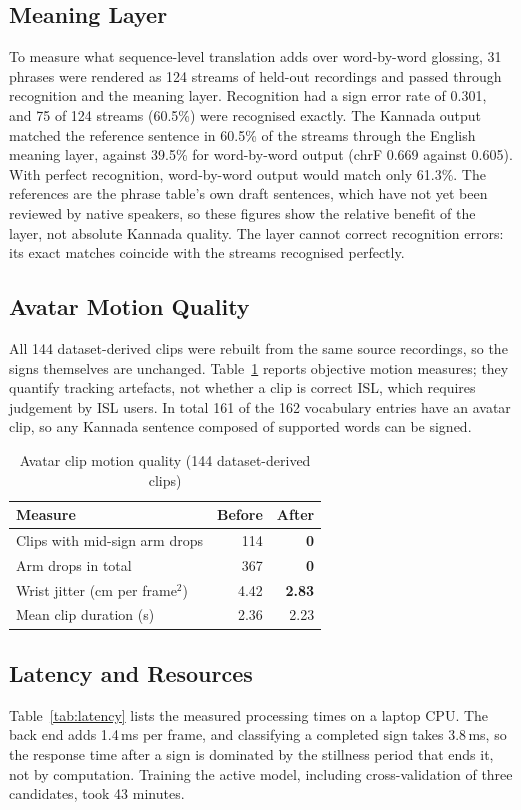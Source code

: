 \documentclass[conference]{IEEEtran}
\begin{document}
\subsection{Meaning Layer}
To measure what sequence-level translation adds over word-by-word glossing, 31 phrases were rendered as 124 streams of held-out recordings and passed through recognition and the meaning layer. Recognition had a sign error rate of 0.301, and 75 of 124 streams (60.5\%) were recognised exactly. The Kannada output matched the reference sentence in 60.5\% of the streams through the English meaning layer, against 39.5\% for word-by-word output (chrF 0.669 against 0.605). With perfect recognition, word-by-word output would match only 61.3\%. The references are the phrase table's own draft sentences, which have not yet been reviewed by native speakers, so these figures show the relative benefit of the layer, not absolute Kannada quality. The layer cannot correct recognition errors: its exact matches coincide with the streams recognised perfectly.

\subsection{Avatar Motion Quality}
All 144 dataset-derived clips were rebuilt from the same source recordings, so the signs themselves are unchanged. Table~\ref{tab:avatar} reports objective motion measures; they quantify tracking artefacts, not whether a clip is correct ISL, which requires judgement by ISL users. In total 161 of the 162 vocabulary entries have an avatar clip, so any Kannada sentence composed of supported words can be signed.

\begin{table}[t]
\caption{Avatar clip motion quality (144 dataset-derived clips)}
\label{tab:avatar}
\centering
\begin{tabular}{@{}lrr@{}}
\toprule
Measure & Before & After \\
\midrule
Clips with mid-sign arm drops & 114 & \textbf{0} \\
Arm drops in total & 367 & \textbf{0} \\
Wrist jitter (cm per frame$^2$) & 4.42 & \textbf{2.83} \\
Mean clip duration (s) & 2.36 & 2.23 \\
\bottomrule
\end{tabular}
\end{table}

\subsection{Latency and Resources}
Table~\ref{tab:latency} lists the measured processing times on a laptop CPU. The back end adds 1.4\,ms per frame, and classifying a completed sign takes 3.8\,ms, so the response time after a sign is dominated by the stillness period that ends it, not by computation. Training the active model, including cross-validation of three candidates, took 43 minutes.
\end{document}
